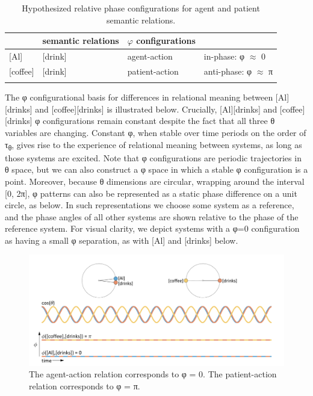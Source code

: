   \begin{table}
\begin{tabularx}{\textwidth}{XXll}
  \lsptoprule
  \multicolumn{2}{c}{\textbf{conceptual systems}} & 
  \textbf{semantic relations} & 
  \textbf{$\varphi$ configurations}\\
  \midrule{}
  [Al] & [drink] & agent-action & in-phase: φ ${\approx}$ 0\\{}
  [coffee] & [drink] & patient-action & anti-phase: φ ${\approx}$ π\\
  \lspbottomrule
  \end{tabularx}
\caption{Hypothesized relative phase configurations for agent and patient semantic relations.}
\label{tab:1:1}
\end{table}

  The φ configurational basis for differences in relational meaning between [Al][drinks] and [coffee][drinks] is illustrated below. Crucially, [Al][drinks] and [coffee][drinks] φ configurations remain constant despite the fact that all three θ variables are changing. Constant φ, when stable over time periods on the order of τ\textsubscript{θ}, gives rise to the experience of relational meaning between systems, as long as those systems are excited. Note that φ configurations are periodic trajectories in θ space, but we can also construct a φ space in which a stable φ configuration is a point. Moreover, because θ dimensions are circular, wrapping around the interval [0, 2π], φ patterns can also be represented as a static phase difference on a unit circle, as below. In such representations we choose some system as a reference, and the phase angles of all other systems are shown relative to the phase of the reference system. For visual clarity, we depict systems with a φ=0 configuration as having a small φ separation, as with [Al] and [drinks] below.

  
\begin{figure}
\includegraphics[width=\textwidth]{figures/Tilsen-img15.png}
\caption{The agent-action relation corresponds to φ = 0. The patient-action relation corresponds to φ = π.}
\label{fig:2:8}
\end{figure}
 


